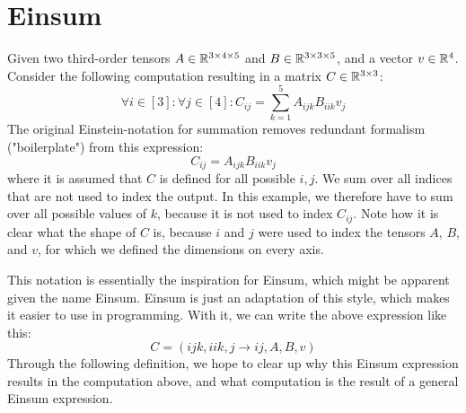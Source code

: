 \chapter{Einsum}
\label{chap:einsum}

Given two third-order tensors $A \in \mathbb{R}^{3 \times 4 \times 5}$ and $B \in \mathbb{R}^{3 \times 3 \times 5}$, and a vector $v \in \mathbb{R}^4$.
Consider the following computation resulting in a matrix $C \in \mathbb{R}^{3 \times 3}$:
$$\forall i \in [3]: \forall j \in [4]: C_{ij} = \sum\limits_{k = 1}^{5} A_{ijk} B_{iik} v_j$$
The original Einstein-notation for summation removes redundant formalism ("boilerplate") from this expression:
$$C_{ij} = A_{ijk} B_{iik} v_j$$
where it is assumed that $C$ is defined for all possible $i,j$.
We sum over all indices that are not used to index the output.
In this example, we therefore have to sum over all possible values of $k$, because it is not used to index $C_{ij}$.
Note how it is clear what the shape of $C$ is, because $i$ and $j$ were used to index the tensors $A$, $B$, and $v$,
for which we defined the dimensions on every axis.

This notation is essentially the inspiration for Einsum, which might be apparent given the name Einsum.
Einsum is just an adaptation of this style, which makes it easier to use in programming.
With it, we can write the above expression like this:
$$C = (ijk, iik, j \rightarrow ij, A, B, v)$$
Through the following definition, we hope to clear up why this Einsum expression results in the computation above,
and what computation is the result of a general Einsum expression.

